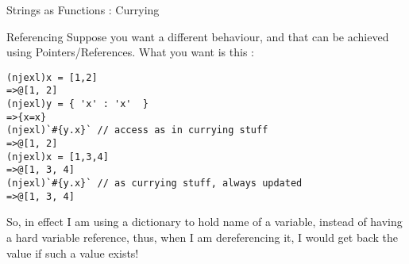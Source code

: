 \begin{section}{Strings as Functions : Currying}
\begin{subsection}{Referencing}
Suppose you want a different behaviour, and that can be achieved using Pointers/References. 
What you want is this :

\begin{lstlisting}[style=all]
(njexl)x = [1,2]
=>@[1, 2]
(njexl)y = { 'x' : 'x'  }
=>{x=x}
(njexl)`#{y.x}` // access as in currying stuff
=>@[1, 2]
(njexl)x = [1,3,4]
=>@[1, 3, 4]
(njexl)`#{y.x}` // as currying stuff, always updated 
=>@[1, 3, 4]
\end{lstlisting}

So, in effect I am using a dictionary to hold name of a variable, instead of having a hard variable reference, 
thus, when I am dereferencing it, I would get back the value if such a value exists!

\end{subsection}

\end{section}

